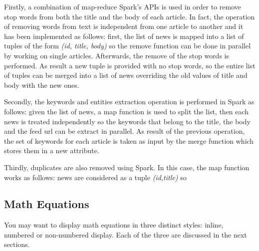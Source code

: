 \documentclass{acm_proc_article-sp}
\begin{document}
Firstly, a combination of map-reduce Spark's APIs is used in order to remove stop words from both the title and the body of each article. In fact, the operation of removing words from text is independent from one article to another and it has been implemented as follows: first, the list of news is mapped into a list of tuples of the form \textit{(id, title, body)} so the remove function can be done in parallel by working on single articles. Afterwards, the remove of the stop words is performed. As result a new tuple is provided with no stop words, so the entire list of tuples can be merged into a list of news overriding the old values of title and body with the new ones.



Secondly, the keywords and entities extraction operation is performed in Spark as follows: given the list of news, a map function is used to split the list, then each news is treated independently so the keywords that belong to the title, the body and the feed url can be extract in parallel. As result of the previous operation, the set of keywords for each article is taken as input by the merge function which stores them in a new attribute.

Thirdly, duplicates are also removed using Spark. In this case, the map function works as follows: news are considered as a tuple \textit{(id,title)} so 





\subsection{Math Equations}
You may want to display math equations in three distinct styles:
inline, numbered or non-numbered display. Each of
the three are discussed in the next sections.
\end{document}
